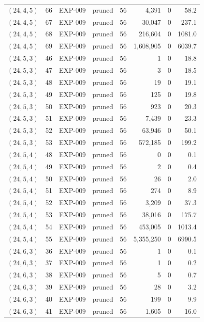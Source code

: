 \begin{longtable}{lrllrrrr}
$(24,4,5)$ & 66 & EXP-009 & pruned & 56 & 4{,}391 & 0 & 58.2 \\
$(24,4,5)$ & 67 & EXP-009 & pruned & 56 & 30{,}047 & 0 & 237.1 \\
$(24,4,5)$ & 68 & EXP-009 & pruned & 56 & 216{,}604 & 0 & 1081.0 \\
$(24,4,5)$ & 69 & EXP-009 & pruned & 56 & 1{,}608{,}905 & 0 & 6039.7 \\
$(24,5,3)$ & 46 & EXP-009 & pruned & 56 & 1 & 0 & 18.8 \\
$(24,5,3)$ & 47 & EXP-009 & pruned & 56 & 3 & 0 & 18.5 \\
$(24,5,3)$ & 48 & EXP-009 & pruned & 56 & 19 & 0 & 19.1 \\
$(24,5,3)$ & 49 & EXP-009 & pruned & 56 & 125 & 0 & 19.8 \\
$(24,5,3)$ & 50 & EXP-009 & pruned & 56 & 923 & 0 & 20.3 \\
$(24,5,3)$ & 51 & EXP-009 & pruned & 56 & 7{,}439 & 0 & 23.3 \\
$(24,5,3)$ & 52 & EXP-009 & pruned & 56 & 63{,}946 & 0 & 50.1 \\
$(24,5,3)$ & 53 & EXP-009 & pruned & 56 & 572{,}185 & 0 & 199.2 \\
$(24,5,4)$ & 48 & EXP-009 & pruned & 56 & 0 & 0 & 0.1 \\
$(24,5,4)$ & 49 & EXP-009 & pruned & 56 & 2 & 0 & 0.4 \\
$(24,5,4)$ & 50 & EXP-009 & pruned & 56 & 26 & 0 & 2.0 \\
$(24,5,4)$ & 51 & EXP-009 & pruned & 56 & 274 & 0 & 8.9 \\
$(24,5,4)$ & 52 & EXP-009 & pruned & 56 & 3{,}209 & 0 & 37.3 \\
$(24,5,4)$ & 53 & EXP-009 & pruned & 56 & 38{,}016 & 0 & 175.7 \\
$(24,5,4)$ & 54 & EXP-009 & pruned & 56 & 453{,}005 & 0 & 1013.4 \\
$(24,5,4)$ & 55 & EXP-009 & pruned & 56 & 5{,}355{,}250 & 0 & 6990.5 \\
$(24,6,3)$ & 36 & EXP-009 & pruned & 56 & 1 & 0 & 0.1 \\
$(24,6,3)$ & 37 & EXP-009 & pruned & 56 & 1 & 0 & 0.2 \\
$(24,6,3)$ & 38 & EXP-009 & pruned & 56 & 5 & 0 & 0.7 \\
$(24,6,3)$ & 39 & EXP-009 & pruned & 56 & 28 & 0 & 3.2 \\
$(24,6,3)$ & 40 & EXP-009 & pruned & 56 & 199 & 0 & 9.9 \\
$(24,6,3)$ & 41 & EXP-009 & pruned & 56 & 1{,}605 & 0 & 16.0 \\

\end{longtable}
